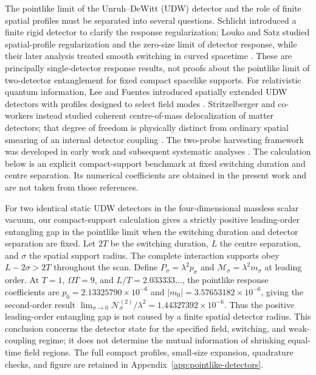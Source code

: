 \documentclass[pdflatex,sn-mathphys-num]{sn-jnl}
\begin{document}
The pointlike limit of the Unruh--DeWitt (UDW) detector and the role of finite spatial profiles must be separated into several questions. Schlicht introduced a finite rigid detector to clarify the response regularization; Louko and Satz studied spatial-profile regularization and the zero-size limit of detector response, while their later analysis treated smooth switching in curved spacetime \cite{Schlicht2004,LoukoSatz2006,LoukoSatz2008}. These are principally single-detector response results, not proofs about the pointlike limit of two-detector entanglement for fixed compact spacelike supports. For relativistic quantum information, Lee and Fuentes introduced spatially extended UDW detectors with profiles designed to select field modes \cite{LeeFuentes2014}. Stritzelberger and co-workers instead studied coherent centre-of-mass delocalization of matter detectors; that degree of freedom is physically distinct from ordinary spatial smearing of an internal detector coupling \cite{Stritzelberger2021}. The two-probe harvesting framework was developed in early work and subsequent systematic analyses \cite{Reznik2003,PozasKerstjens2015}. The calculation below is an explicit compact-support benchmark at fixed switching duration and centre separation. Its numerical coefficients are obtained in the present work and are not taken from those references.

For two identical static UDW detectors in the four-dimensional massless scalar vacuum, our compact-support calculation gives a strictly positive leading-order entangling gap in the pointlike limit when the switching duration and detector separation are fixed. Let $2T$ be the switching duration, $L$ the centre separation, and $\sigma$ the spatial support radius. The complete interaction supports obey $L-2\sigma>2T$ throughout the scan. Define $P_\sigma=\lambda^2p_\sigma$ and $\mathcal M_\sigma=\lambda^2m_\sigma$ at leading order. At $T=1$, $\Omega T=9$, and $L/T=2.033333\ldots$, the pointlike response coefficients are $p_0=2.13325790\times10^{-6}$ and $|m_0|=3.57653182\times10^{-6}$, giving the second-order result $\lim_{\sigma\to0}\mathcal N_\sigma^{(2)}/\lambda^2=1.44327392\times10^{-6}$. Thus the positive leading-order entangling gap is not caused by a finite spatial detector radius. This conclusion concerns the detector state for the specified field, switching, and weak-coupling regime; it does not determine the mutual information of shrinking equal-time field regions. The full compact profiles, small-size expansion, quadrature checks, and figure are retained in Appendix~\ref{app:pointlike-detectors}.
\end{document}
